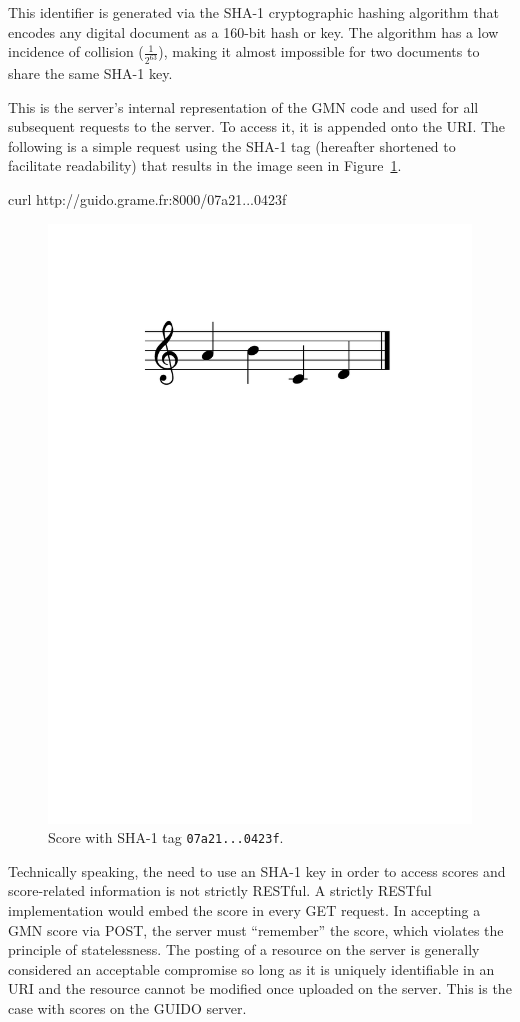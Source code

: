 \documentclass[11pt,a4paper]{article}
\newenvironment{code}		{\vspace{-2mm} \fontsize{8.5pt}{12pt}\selectfont \verbatim}{\endverbatim\vspace{-2mm}}
\begin{document}
This identifier is generated via the SHA-1 cryptographic hashing algorithm \cite{sha1} that encodes any digital document as a 160-bit hash or key.  The algorithm has a low incidence of collision ($\frac{1}{2^{63}}$), making it almost impossible for two documents to share the same SHA-1 key.\par
This is the server's internal representation of the GMN code and used for all subsequent requests to the server.  To access it, it is appended onto the URI.  The following is a simple request using the SHA-1 tag (hereafter shortened to facilitate readability) that results in the image seen in Figure~\ref{fig:figure1}.\par
\begin{code}
   curl http://guido.grame.fr:8000/07a21...0423f
\end{code}
\begin{figure}[h]
  \centering
    \includegraphics[width=0.6\columnwidth]{figure1}
  \cprotect\caption{\label{fig:figure1}Score with SHA-1 tag \verb=07a21...0423f=.}
\end{figure}\par
Technically speaking, the need to use an SHA-1 key in order to access scores and score-related information is not strictly RESTful.  A strictly RESTful implementation would embed the score in every GET request. In accepting a GMN score via POST, the server must ``remember'' the score, which violates the principle of statelessness.  The posting of a resource on the server is generally considered an acceptable compromise \cite{richardson2008restful} so long as it is uniquely identifiable in an URI and the resource cannot be modified once uploaded on the server.  This is the case with scores on the GUIDO server.\par
\end{document}
